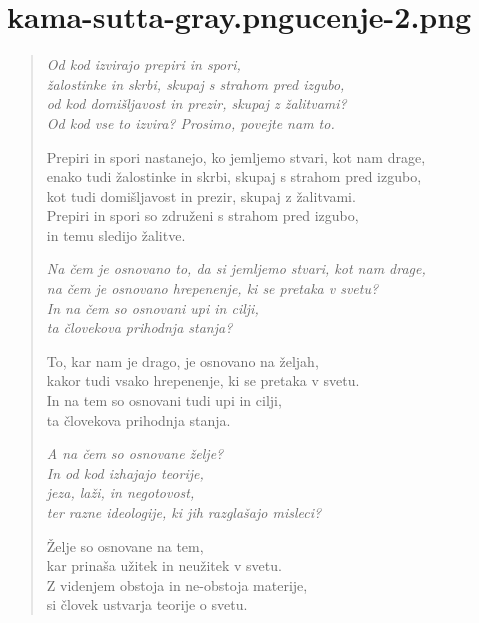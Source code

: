 
\chapter[Kalahavivāda Sutta]{{kama-sutta-gray.png}{ucenje-2.png}}

\begin{verse}


\emph{Od kod izvirajo prepiri in spori,\\
žalostinke in skrbi, skupaj s strahom pred izgubo,\\
od kod domišljavost in prezir, skupaj z žalitvami?\\
Od kod vse to izvira? Prosimo, povejte nam to.}

Prepiri in spori nastanejo, ko jemljemo stvari, kot nam drage,\\
enako tudi žalostinke in skrbi, skupaj s strahom pred izgubo,\\
kot tudi domišljavost in prezir, skupaj z žalitvami.\\
Prepiri in spori so združeni s strahom pred izgubo,\\
in temu sledijo žalitve.

\emph{Na čem je osnovano to, da si jemljemo stvari, kot nam drage,}\\
\emph{na čem je osnovano hrepenenje, ki se pretaka v svetu?}\\
\emph{In na čem so osnovani upi in cilji,}\\
\emph{ta človekova prihodnja stanja?}

To, kar nam je drago, je osnovano na željah,\\
kakor tudi vsako hrepenenje, ki se pretaka v svetu.\\
In na tem so osnovani tudi upi in cilji,\\
ta človekova prihodnja stanja.

\emph{A na čem so osnovane želje?}\\
\emph{In od kod izhajajo teorije,}\\
\emph{jeza, laži, in negotovost,}\\
\emph{ter razne ideologije, ki jih razglašajo misleci?}

Želje so osnovane na tem,\\
kar prinaša užitek in neužitek v svetu.\\
Z videnjem obstoja in ne-obstoja materije,\\
si človek ustvarja teorije o svetu.


\end{verse}
